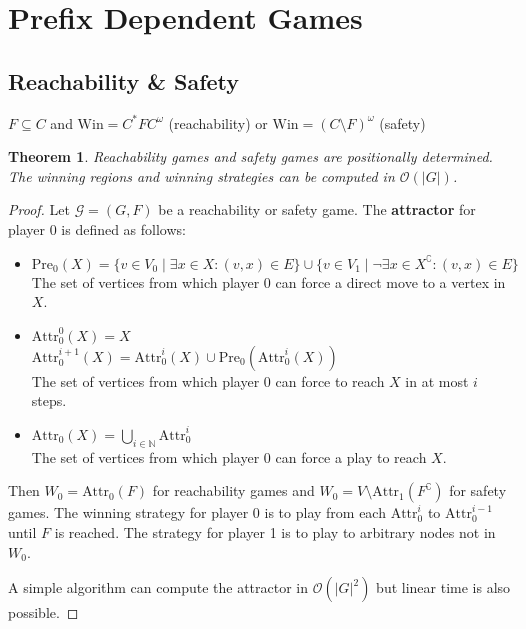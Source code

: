 \documentclass{article}
\newtheorem{theorem}{Theorem}
\begin{document}
\newpage

\section{Prefix Dependent Games}
\subsection{Reachability \& Safety}
$F \subseteq C$ and $\text{Win} = C^* F C^\omega$ (reachability) or $\text{Win} = (C \setminus F)^\omega$ (safety)

\begin{theorem}
	Reachability games and safety games are positionally determined. The winning regions and winning strategies can be computed in $\mathcal{O}(|G|)$.
\end{theorem}
\begin{proof}
	Let $\mathcal{G} = (G, F)$ be a reachability or safety game. The \textbf{attractor} for player 0 is defined as follows:
	\begin{itemize}
		\item $\text{Pre}_0(X) = \{ v \in V_0 \mid \exists x \in X: (v, x) \in E \} \cup \{ v \in V_1 \mid \neg \exists x \in X^\complement: (v, x) \in E \}$ \\
			The set of vertices from which player 0 can force a direct move to a vertex in $X$.
		\item $\text{Attr}_0^0(X) = X$ \\
			$\text{Attr}_0^{i+1}(X) = \text{Attr}_0^i(X) \cup \text{Pre}_0(\text{Attr}_0^i(X))$ \\
			The set of vertices from which player 0 can force to reach $X$ in at most $i$ steps.
		\item $\text{Attr}_0(X) = \bigcup_{i \in \mathbb{N}} \text{Attr}_0^i$ \\
			The set of vertices from which player 0 can force a play to reach $X$.
	\end{itemize}
	
	Then $W_0 = \text{Attr}_0(F)$ for reachability games and $W_0 = V \setminus \text{Attr}_1(F^\complement)$ for safety games. The winning strategy for player 0 is to play from each $\text{Attr}^i_0$ to $\text{Attr}^{i-1}_0$ until $F$ is reached. The strategy for player 1 is to play to arbitrary nodes not in $W_0$.
	
	A simple algorithm can compute the attractor in $\mathcal{O}(|G|^2)$ but linear time is also possible.
\end{proof}
\end{document}
